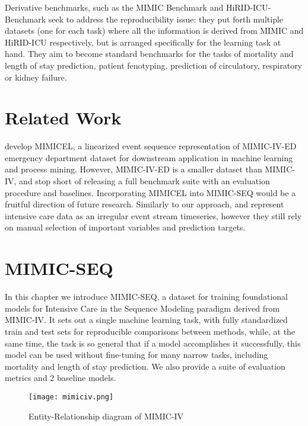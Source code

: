 Derivative benchmarks, such as the MIMIC Benchmark \cite{harutyunyanMultitaskLearningBenchmarking2019} and HiRID-ICU-Benchmark \cite{yecheHiRIDICUBenchmarkComprehensiveMachine} seek to address the reproducibility issue: they put forth multiple datasets (one for each task) where all the information is derived from MIMIC and HiRID-ICU respectively, but is arranged specifically for the learning task at hand. They aim to become standard benchmarks for the tasks of mortality and length of stay prediction, patient fenotyping, prediction of circulatory, respiratory or kidney failure.

\newpage
\section{Related Work}

\cite{weiMIMICELMIMICIVEvent2022} develop MIMICEL, a linearized event sequence representation of MIMIC-IV-ED \cite{johnsonMIMICIVED2021} emergency department dataset for downstream application in machine learning and process mining. 
However, MIMIC-IV-ED is a smaller dataset than MIMIC-IV, and \cite{weiMIMICELMIMICIVEvent2022} stop short of releasing a full benchmark suite with an evaluation procedure and baselines.
Incorporating MIMICEL into MIMIC-SEQ would be a fruitful direction of future research.
Similarly to our approach,
\cite{kuznetsovaImportanceStepwiseEmbeddings2023} and \cite{tipirneniSelfSupervisedTransformerSparse2022} represent intensive care data as an irregular event stream timeseries, however they still rely on manual selection of important variables and prediction targets.

\section{MIMIC-SEQ}
\label{sec:mimicsec-dataset}

In this chapter we introduce MIMIC-SEQ, a dataset for training foundational models for Intensive Care in the Sequence Modeling paradigm derived from MIMIC-IV.
It sets out a single machine learning task, with fully standardized train and test sets for reproducible comparisons between methods, while, at the same time, the task is so general that if a model accomplishes it successfully, this model can be used without fine-tuning for many narrow tasks, including mortality and length of stay prediction.
We also provide a suite of evaluation metrics and 2 baseline models.

\begin{figure}
    \centering
    \texttt{[image: mimiciv.png]}
    \caption{Entity-Relationship diagram of MIMIC-IV}
    \label{fig:mimic}
\end{figure}

